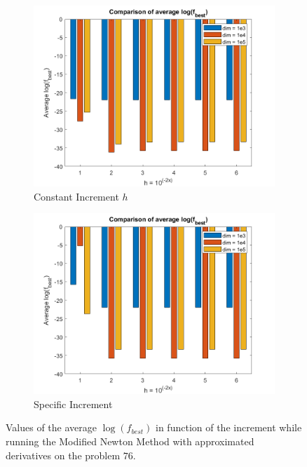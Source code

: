 \begin{figure}[htbp]
    \centering
    \begin{subfigure}[t]{0.45\textwidth}  %
        \centering
        \includegraphics[width=\textwidth]{img/pb76_MN_difffinite_COST_log(fbest).png}
        \caption{Constant Increment $h$}
    \end{subfigure}
    \hspace{1cm} %
    \begin{subfigure}[t]{0.45\textwidth}
        \centering
        \includegraphics[width=\textwidth]{img/pb76_MN_difffinite_REL_log(fbest).png}
        \caption{Specific Increment }
    \end{subfigure}
    \caption{ \small Values of the average $\log(f_{best})$ in function of the increment while running the Modified Newton Method with approximated derivatives on the problem $76$.}
    \label{logfbest_difffinite76}
\end{figure}

